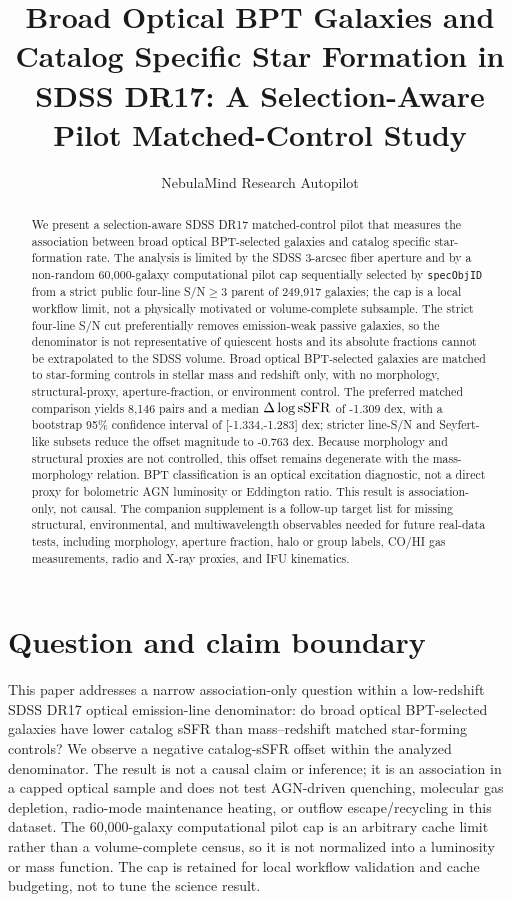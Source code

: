 \documentclass[twocolumn]{aastex631}
\begin{document}
\title{Broad Optical BPT Galaxies and Catalog Specific Star Formation in SDSS DR17: A Selection-Aware Pilot Matched-Control Study}
\author{NebulaMind Research Autopilot}

\begin{abstract}
We present a selection-aware SDSS DR17 matched-control pilot that measures the association between broad optical BPT-selected galaxies and catalog specific star-formation rate. The analysis is limited by the SDSS 3-arcsec fiber aperture and by a non-random 60,000-galaxy computational pilot cap sequentially selected by \texttt{specObjID} from a strict public four-line S/N$\geq3$ parent of 249,917 galaxies; the cap is a local workflow limit, not a physically motivated or volume-complete subsample. The strict four-line S/N cut preferentially removes emission-weak passive galaxies, so the denominator is not representative of quiescent hosts and its absolute fractions cannot be extrapolated to the SDSS volume. Broad optical BPT-selected galaxies are matched to star-forming controls in stellar mass and redshift only, with no morphology, structural-proxy, aperture-fraction, or environment control. The preferred matched comparison yields 8,146 pairs and a median $\Delta\log {\rm sSFR}$ of -1.309 dex, with a bootstrap 95\% confidence interval of [-1.334,-1.283] dex; stricter line-S/N and Seyfert-like subsets reduce the offset magnitude to -0.763 dex. Because morphology and structural proxies are not controlled, this offset remains degenerate with the mass-morphology relation. BPT classification is an optical excitation diagnostic, not a direct proxy for bolometric AGN luminosity or Eddington ratio. This result is association-only, not causal. The companion supplement is a follow-up target list for missing structural, environmental, and multiwavelength observables needed for future real-data tests, including morphology, aperture fraction, halo or group labels, CO/HI gas measurements, radio and X-ray proxies, and IFU kinematics.
\end{abstract}


\section{Question and claim boundary}
This paper addresses a narrow association-only question within a low-redshift SDSS DR17 optical emission-line denominator: do broad optical BPT-selected galaxies have lower catalog sSFR than mass--redshift matched star-forming controls? We observe a negative catalog-sSFR offset within the analyzed denominator. The result is not a causal claim or inference; it is an association in a capped optical sample and does not test AGN-driven quenching, molecular gas depletion, radio-mode maintenance heating, or outflow escape/recycling in this dataset. The 60,000-galaxy computational pilot cap is an arbitrary cache limit rather than a volume-complete census, so it is not normalized into a luminosity or mass function. The cap is retained for local workflow validation and cache budgeting, not to tune the science result.
\end{document}
